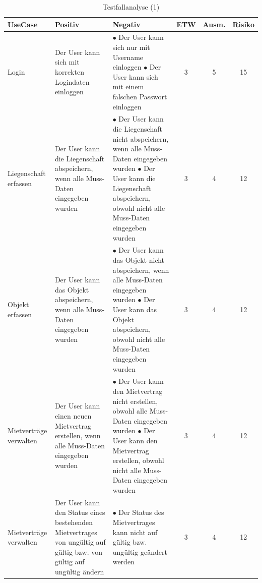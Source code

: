 \begin{table}[H]
  \centering
  \settowidth{}
  \setlength\extrarowheight{2pt}
  \begin{tabulary}{1.0\textwidth}{|L|L|L|C|C|C|}
    \hline
    \textbf{UseCase} & 
    \textbf{Positiv}& 
    \textbf{Negativ} &
    \textbf{ETW} & 
    \textbf{Ausm.} & 
    \textbf{Risiko}\\
    \hline
    Login &  Der User kann sich mit korrekten Logindaten einloggen & $\bullet$ Der User kann sich nur mit Username einloggen \newline $\bullet$  Der User kann sich mit einem falschen Passwort einloggen & 3 & 5 &  15\\
    \hline
    Liegenschaft erfassen &  Der User kann die Liegenschaft abspeichern, wenn alle Muss-Daten eingegeben wurden & $\bullet$ Der User kann die Liegenschaft nicht abspeichern, wenn alle Muss-Daten eingegeben wurden \newline $\bullet$  Der User kann die Liegenschaft abspeichern, obwohl nicht alle Muss-Daten eingegeben wurden  & 3 & 4 &  12\\
    \hline
    Objekt erfassen &  Der User kann das Objekt abspeichern, wenn alle Muss-Daten eingegeben wurden & $\bullet$ Der User kann das Objekt nicht abspeichern, wenn alle Muss-Daten eingegeben wurden \newline $\bullet$  Der User kann das Objekt abspeichern, obwohl nicht alle Muss-Daten eingegeben wurden & 3 & 4 &  12\\
    \hline
    Mietverträge verwalten &  Der User kann einen neuen Mietvertrag erstellen, wenn alle Muss-Daten eingegeben wurden & $\bullet$ Der User kann den Mietvertrag nicht erstellen, obwohl alle Muss-Daten eingegeben wurden \newline $\bullet$  Der User kann den Mietvertrag erstellen, obwohl nicht alle Muss-Daten eingegeben wurden & 3 & 4 &  12\\
    \hline
    Mietverträge verwalten &  Der User kann den Status eines bestehenden Mietvertrages von ungültig auf gültig bzw. von gültig auf ungültig ändern & $\bullet$ Der Status des Mietvertrages kann nicht auf gültig bzw. ungültig geändert werden & 3 & 4 &  12\\
    \hline
  \end{tabulary}
  \caption{Testfallanalyse (1)}
  \label{testanforderungen}
\end{table}


